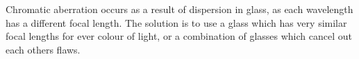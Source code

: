 \documentclass[12pt]{report}
\begin{document}
\begin{flushleft}
\bigskip
Chromatic aberration occurs as a result of dispersion in glass, as each
wavelength has a different focal length. The solution is to use a glass which
has very similar focal lengths for ever colour of light, or a combination of
glasses which cancel out each others flaws.

\end{flushleft}
\end{document}
